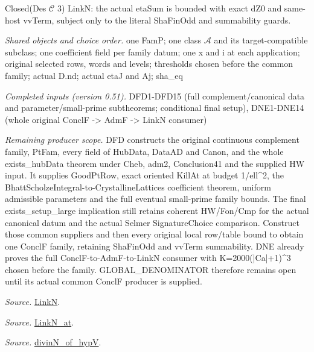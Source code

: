 Closed(Des $\mathcal C$ 3) LinkN: the actual etaSum is bounded with exact dZ0 and same-host vvTerm, subject only to the literal ShaFinOdd and summability guards.

\emph{Shared objects and choice order.} one FamP; one class $\mathcal A$ and its target-compatible subclass; one coefficient field per family datum; one x and i at each application; original selected rows, words and levels; thresholds chosen before the common family; actual D.nd; actual etaJ and Aj; sha\_\allowbreak eq

\emph{Completed inputs (version 0.51).} DFD1-DFD15 (full complement/canonical data and parameter/small-prime subtheorems; conditional final setup), DNE1-DNE14 (whole original ConclF -> AdmF -> LinkN consumer)

\emph{Remaining producer scope.} DFD constructs the original continuous complement family, PtFam, every field of HubData, DataAD and Canon, and the whole exists\_\allowbreak hubData theorem under Cheb, adm2, Conclusion41 and the supplied HW input. It supplies GoodPtRow, exact oriented KillAt at budget 1/ell\textasciicircum{}2, the BhattScholzeIntegral-to-CrystallineLattices coefficient theorem, uniform admissible parameters and the full eventual small-prime family bounds. The final exists\_\allowbreak setup\_\allowbreak large implication still retains coherent HW/Fon/Cmp for the actual canonical datum and the actual Selmer SignatureChoice comparison. Construct those common suppliers and then every original local row/table bound to obtain one ConclF family, retaining ShaFinOdd and vvTerm summability. DNE already proves the full ConclF-to-AdmF-to-LinkN consumer with K=2000(|Ca|+1)\textasciicircum{}3 chosen before the family. GLOBAL\_\allowbreak DENOMINATOR therefore remains open until its actual common ConclF producer is supplied.

\emph{Source.} \href{https://github.com/CocoSgt/riemann-hypothesis-lean/blob/7cbf7a0c32fca1badf05931879a37c3f8a2b03b4/src/Formalism/SharpRestriction/GlobalTheoremInputs.lean#L45-L48}{LinkN}.

\emph{Source.} \href{https://github.com/CocoSgt/riemann-hypothesis-lean/blob/7cbf7a0c32fca1badf05931879a37c3f8a2b03b4/src/Formalism/SharpRestriction/GlobalTheoremInputs.lean#L40-L44}{LinkN\_\allowbreak at}.

\emph{Source.} \href{https://github.com/CocoSgt/riemann-hypothesis-lean/blob/7cbf7a0c32fca1badf05931879a37c3f8a2b03b4/src/Development/AutomorphicArithmetic/CharacterBoxes/DivinNOfHypV.lean#L117-L134}{divinN\_\allowbreak of\_\allowbreak hypV}.



